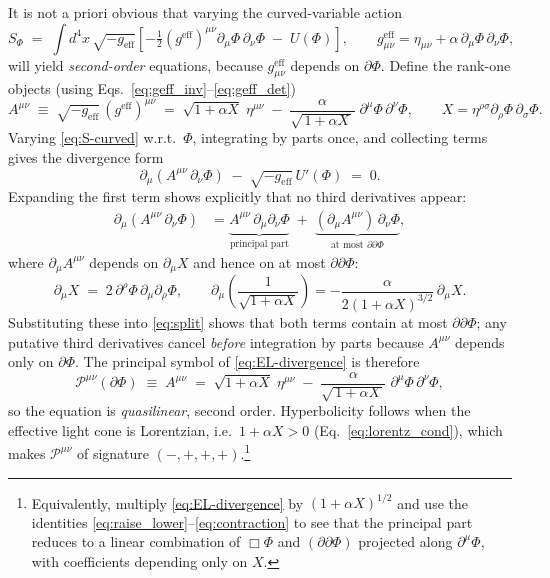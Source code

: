 \documentclass{article}
\begin{document}
It is not a priori obvious that varying the curved-variable action
\begin{equation}
S_\Phi \;=\; \int d^4x\,\sqrt{-g_{\mathrm{eff}}}\left[-\tfrac{1}{2}(g^{\mathrm{eff}})^{\mu\nu}
\partial_\mu\Phi\,\partial_\nu\Phi \;-\; U(\Phi)\right],
\qquad g^{\mathrm{eff}}_{\mu\nu}=\eta_{\mu\nu}+\alpha\,\partial_\mu\Phi\,\partial_\nu\Phi,
\label{eq:S-curved}
\end{equation}
will yield \emph{second-order} equations, because $g^{\mathrm{eff}}_{\mu\nu}$ depends on $\partial\Phi$.
Define the rank-one objects (using Eqs.~\eqref{eq:geff_inv}–\eqref{eq:geff_det})
\begin{equation}
A^{\mu\nu} \;\equiv\; \sqrt{-g_{\mathrm{eff}}}\,(g^{\mathrm{eff}})^{\mu\nu}
\;=\; \sqrt{1+\alpha X}\;\eta^{\mu\nu}
\;-\;\frac{\alpha}{\sqrt{\,1+\alpha X\,}}\;\partial^\mu\Phi\,\partial^\nu\Phi,
\qquad X=\eta^{\rho\sigma}\partial_\rho\Phi\,\partial_\sigma\Phi.
\label{eq:Amunu-def}
\end{equation}
Varying \eqref{eq:S-curved} w.r.t.\ $\Phi$, integrating by parts once, and collecting terms gives the divergence form
\begin{equation}
\partial_\mu\!\left( A^{\mu\nu}\,\partial_\nu\Phi \right) \;-\; \sqrt{-g_{\mathrm{eff}}}\,U'(\Phi) \;=\; 0.
\label{eq:EL-divergence}
\end{equation}
Expanding the first term shows explicitly that no third derivatives appear:
\begin{align}
\partial_\mu\!\left( A^{\mu\nu}\,\partial_\nu\Phi \right)
&= \underbrace{A^{\mu\nu}\,\partial_\mu\partial_\nu\Phi}_{\text{principal part}}
\;+\; \underbrace{(\partial_\mu A^{\mu\nu})\,\partial_\nu\Phi}_{\text{at most }\partial\partial\Phi}\!,
\label{eq:split}
\end{align}
where $\partial_\mu A^{\mu\nu}$ depends on $\partial_\mu X$ and hence on at most \(\partial\partial\Phi\):
\[
\partial_\mu X \;=\; 2\,\partial^\rho\Phi\,\partial_\mu\partial_\rho\Phi,
\qquad
\partial_\mu\!\left( \frac{1}{\sqrt{1+\alpha X}} \right)
= -\frac{\alpha}{2(1+\alpha X)^{3/2}}\,\partial_\mu X.
\]
Substituting these into \eqref{eq:split} shows that both terms contain at most \(\partial\partial\Phi\); any putative third derivatives cancel \emph{before} integration by parts because $A^{\mu\nu}$ depends only on \(\partial\Phi\). The principal symbol of \eqref{eq:EL-divergence} is therefore
\begin{equation}
\mathcal{P}^{\mu\nu}(\partial\Phi)\;\equiv\;A^{\mu\nu}
\;=\; \sqrt{1+\alpha X}\;\eta^{\mu\nu}
\;-\;\frac{\alpha}{\sqrt{\,1+\alpha X\,}}\;\partial^\mu\Phi\,\partial^\nu\Phi,
\label{eq:principal-symbol}
\end{equation}
so the equation is \emph{quasilinear}, second order. Hyperbolicity follows when the effective light cone is Lorentzian, i.e.\ $1+\alpha X>0$ (Eq.~\eqref{eq:lorentz_cond}), which makes $\mathcal{P}^{\mu\nu}$ of signature $(-,+,+,+)$.\footnote{Equivalently, multiply \eqref{eq:EL-divergence} by $(1+\alpha X)^{1/2}$ and use the identities \eqref{eq:raise_lower}–\eqref{eq:contraction} to see that the principal part reduces to a linear combination of $\Box\Phi$ and $(\partial\partial\Phi)$ projected along $\partial^\mu\Phi$, with coefficients depending only on $X$.}
\end{document}
